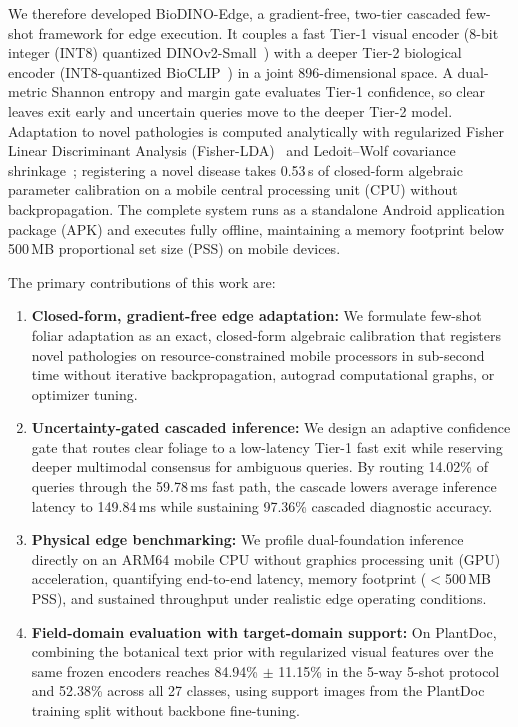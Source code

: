 We therefore developed BioDINO-Edge, a gradient-free, two-tier cascaded few-shot framework for edge execution. It couples a fast Tier-1 visual encoder (8-bit integer (INT8) quantized DINOv2-Small~\cite{oquab2023dinov2}) with a deeper Tier-2 biological encoder (INT8-quantized BioCLIP~\cite{stevens2024bioclip}) in a joint 896-dimensional space. A dual-metric Shannon entropy and margin gate evaluates Tier-1 confidence, so clear leaves exit early and uncertain queries move to the deeper Tier-2 model. Adaptation to novel pathologies is computed analytically with regularized Fisher Linear Discriminant Analysis (Fisher-LDA)~\cite{fisher1936use,rao1948utilization} and Ledoit--Wolf covariance shrinkage~\cite{ledoit2004well}; registering a novel disease takes 0.53\,s of closed-form algebraic parameter calibration on a mobile central processing unit (CPU) without backpropagation. The complete system runs as a standalone Android application package (APK) and executes fully offline, maintaining a memory footprint below 500\,MB proportional set size (PSS) on mobile devices.

The primary contributions of this work are:
\begin{enumerate}
    \item \textbf{Closed-form, gradient-free edge adaptation:} We formulate few-shot foliar adaptation as an exact, closed-form algebraic calibration that registers novel pathologies on resource-constrained mobile processors in sub-second time without iterative backpropagation, autograd computational graphs, or optimizer tuning.
    \item \textbf{Uncertainty-gated cascaded inference:} We design an adaptive confidence gate that routes clear foliage to a low-latency Tier-1 fast exit while reserving deeper multimodal consensus for ambiguous queries. By routing 14.02\% of queries through the 59.78\,ms fast path, the cascade lowers average inference latency to 149.84\,ms while sustaining 97.36\% cascaded diagnostic accuracy.
    \item \textbf{Physical edge benchmarking:} We profile dual-foundation inference directly on an ARM64 mobile CPU without graphics processing unit (GPU) acceleration, quantifying end-to-end latency, memory footprint ($<$500\,MB PSS), and sustained throughput under realistic edge operating conditions.
    \item \textbf{Field-domain evaluation with target-domain support:} On PlantDoc, combining the botanical text prior with regularized visual features over the same frozen encoders reaches 84.94\% $\pm$ 11.15\% in the 5-way 5-shot protocol and 52.38\% across all 27 classes, using support images from the PlantDoc training split without backbone fine-tuning.
\end{enumerate}

